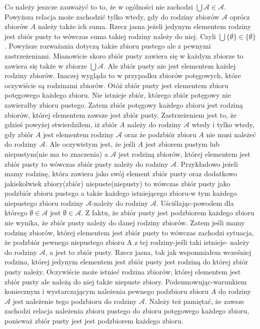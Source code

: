 \begin{remark}
Co należy jeszcze zauważyć to to, że w ogólności nie zachodzi $\bigcup\mathcal{A}\in\mathcal{A}$. Powyższa relacja może zachodzić tylko wtedy, gdy do rodziny zbiorów $\mathcal{A}$ oprócz zbiorów $A$ należy także ich suma. Rzecz jasna jeżeli jedynym elementem rodziny jest zbiór pusty to wówczas suma takiej rodziny należy do niej. Czyli $\bigcup\{\emptyset\}\in\{\emptyset\}$. Powyższe rozważania dotyczą także zbioru pustego ale z pewnymi zastrzeżeniami. Mianowicie skoro zbiór pusty zawiera się w każdym zbiorze to zawiera się także w zbiorze $\bigcup\mathcal{A}$. Ale zbiór pusty nie jest elementem każdej rodziny zbiorów. Inaczej wygląda to w przypadku zbiorów potęgowych, które oczywiście są rodzinami zbiorów. Otóż zbiór pusty jest elementem zbioru potęgowego każdego zbioru. Nie istnieje zbiór, którego zbiór potęgowy nie zawierałby zbioru pustego. Zatem zbiór potęgowy każdego zbioru jest rodziną zbiorów, której elementem zawsze jest zbiór pusty. Zastrzeżeniem jest to, że gdzieś powyżej stwierdziłem, iż zbiór $A$ należy do rodziny $\mathcal{A}$ wtedy i tylko wtedy, gdy zbiór $A$ jest elementem rodziny $\mathcal{A}$ oraz że podzbiór zbioru $A$ nie musi należeć do rodziny $\mathcal{A}$. Ale oczywistym jest, że jeśli $A$ jest zbiorem pustym lub niepustym(nie ma to znaczenia) a $\mathcal{A}$ jest rodziną zbiorów, której elementem jest zbiór pusty to wówczas zbiór pusty należy do rodziny $\mathcal{A}$. Przykładowo jeżeli mamy rodzinę, która zawiera jako swój element zbiór pusty oraz dodatkowo jakiekolwiek zbiory(zbiór) niepuste(niepusty) to wówczas zbiór pusty jako podzbiór zbioru pustego a także każdego istniejącego zbioru-w tym każdego niepustego zbioru rodziny $\mathcal{A}$-należy do rodziny $\mathcal{A}$.  Uściślając-powodem dla którego $\emptyset\in\mathcal{A}$ jest $\emptyset\in\mathcal{A}$. Z faktu, że zbiór pusty jest podzbiorem każdego zbioru nie wynika, że zbiór pusty należy do danej rodziny zbiorów. Zatem jeśli mamy rodzinę zbiorów, której elementem jest zbiór pusty to wówczas zachodzi sytuacja, że podzbiór pewnego niepustego zbioru A z tej rodziny-jeśli taki istnieje- należy do rodziny $\mathcal{A}$, a jest to zbiór pusty. Rzecz jasna, tak jak wspomniałem wcześniej rodzina, której jedynym elementem jest zbiór pusty jest rodziną do której zbiór pusty należy. Oczywiście może istnieć rodzina zbiorów, której elementem jest zbiór pusty ale należą do niej także niepuste zbiory. Podsumowując-warunkiem koniecznym i wystarczającym należenia pewnego podzbioru zbioru $A$ do rodziny $\mathcal{A}$ jest należenie tego podzbioru do rodziny $\mathcal{A}$. Należy też pamiętać, że zawsze zachodzi relacja należenia zbioru pustego do zbioru potęgowego każdego zbioru, ponieważ zbiór pusty jest jest podzbiorem każdego zbioru.
\end{remark}
